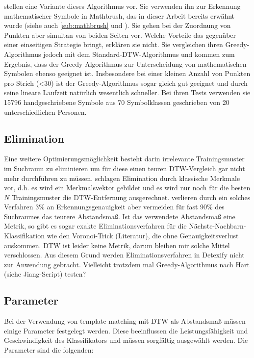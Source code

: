 \citet{MacLean:2010p9970} stellen eine Variante dieses Algorithmus vor. Sie verwenden ihn zur Erkennung mathematischer Symbole in Mathbrush, das in dieser Arbeit bereits erwähnt wurde (siehe auch \ref{sub:mathbrush} und \cite{Labahn:2008p10301}). Sie gehen bei der Zuordnung von Punkten aber simultan von beiden Seiten vor.
Welche Vorteile das gegenüber einer einseitigen Strategie bringt, erklären sie nicht. Sie vergleichen ihren Greedy-Algorithmus jedoch mit dem Standard-DTW-Algorithmus und kommen zum Ergebnis, dass der Greedy-Algorithmus zur Unterscheidung von mathematischen Symbolen ebenso geeignet ist. Insbesondere bei einer kleinen Anzahl von Punkten pro Strich (<30) ist der Greedy-Algorithmus sogar gleich gut geeignet und durch seine lineare Laufzeit natürlich wesentlich schneller. Bei ihren Tests verwenden sie 15796 handgeschriebene Symbole aus 70 Symbolklassen geschrieben von 20 unterschiedlichen Personen.

\subsection{Elimination}
\label{sec:elimnimation}

Eine weitere Optimierungsmöglichkeit besteht darin irrelevante Trainingsmuster im Suchraum zu eliminieren um für diese einen teuren DTW-Vergleich gar nicht mehr durchführen zu müssen. \citet{Watt:2005p1816} schlagen Elimination durch klassische Merkmale vor, d.h. es wird ein Merkmalsvektor gebildet und es wird nur noch für die besten $N$ Trainingsmuster die DTW-Entfernung ausgerechnet. \citet{Watt:2005p1816} verlieren durch ein solches Verfahren 3\% an Erkennungsgenauigkeit aber vermeiden für fast 90\% des Suchraumes das teurere Abstandsmaß.
Ist das verwendete Abstandsmaß eine Metrik, so gibt es sogar exakte Eliminationsverfahren für die Nächste-Nachbarn-Klassifikation wie den Voronoi-Trick (\TODO Literatur), die ohne Genauigkeitsverlust auskommen. DTW ist leider keine Metrik, darum bleiben mir solche Mittel verschlossen.
Aus diesem Grund werden Eliminationsverfahren in Detexify nicht zur Anwendung gebracht.
\TODO Vielleicht trotzdem mal Greedy-Algorithmus nach Hart (siehe Jiang-Script) testen?

\subsection{Parameter}
\label{sec:parameter}

Bei der Verwendung von template matching mit DTW als Abstandsmaß müssen einige Parameter festgelegt werden. Diese beeinflussen die Leistungsfähigkeit und Geschwindigkeit des Klassifikators und müssen sorgfältig ausgewählt werden. Die Parameter sind die folgenden:

